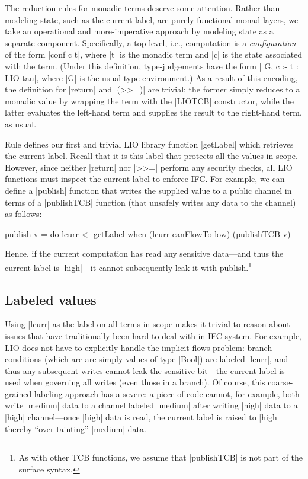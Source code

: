 The reduction rules for monadic terms deserve some attention.
%
Rather than modeling state, such as the current label, are
purely-functional monad layers, we take an operational and
more-imperative approach by modeling state as a separate component.
%
Specifically, a top-level, i.e., computation is a \emph{configuration}
of the form |conf c t|, where |t| is the monadic term and |c| is the
state associated with the term.
%
(Under this definition, \lio{} type-judgements have the form | G, c :-
t : LIO tau|, where |G| is the usual type environment.)
%
As a result of this encoding, the definition for |return| and |(>>=)|
are trivial: the former simply reduces to a monadic value by wrapping
the term with the |LIOTCB| constructor, while the latter evaluates the
left-hand term and supplies the result to the right-hand term, as
usual.
 
Rule  defines our first and trivial LIO library
function |getLabel| which retrieves the current label.
%
Recall that it is this label that protects all the values in scope.
%
However, since neither |return| nor |>>=| perform any security checks,
all LIO functions must inspect the current label to enforce IFC.
%
For example, we can define a |publish| function that writes the
supplied value to a public channel in terms of a |publishTCB| function
(that unsafely writes any data to the channel) as follows:
\begin{code}
publish v = do  lcurr <- getLabel 
                when (lcurr canFlowTo low) (publishTCB v)
\end{code}
Hence, if the current computation has read any sensitive data---and
thus the current label is |high|---it cannot subsequently leak it with
publish.\footnote{
  As with other TCB functions, we assume that |publishTCB| is not part
  of the surface syntax.
}

\subsection{Labeled values}

Using |lcurr| as the label on all terms in scope makes it trivial to
reason about issues that have traditionally been hard to deal with in
IFC system.
%
For example, LIO does not have to explicitly handle the implicit flows
problem: branch conditions (which are are simply values of type
|Bool|) are labeled |lcurr|, and thus any subsequent writes cannot leak
the sensitive bit---the current label is used when governing all
writes (even those in a branch).
%
Of course, this coarse-grained labeling approach has a severe: a piece
of code cannot, for example, both write |medium| data to a channel
labeled |medium| after writing |high| data to a |high| channel---once
|high| data is read, the current label is raised to |high| thereby
``over tainting'' |medium| data.
 
